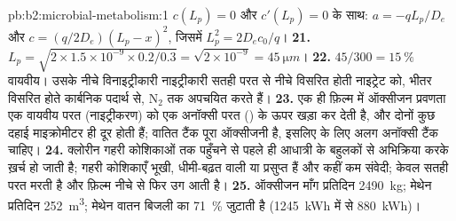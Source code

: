 \begin{solution}{pb:b2:microbial-metabolism:1}
$c(L_p) = 0$ और $c'(L_p) = 0$ के साथ: $a = -qL_p/D_e$ और $c =
(q/2D_e)(L_p - x)^2$, जिसमें $L_p^2 = 2D_ec_0/q$।
\textbf{21.} $L_p = \sqrt{2\times 1.5\times 10^{-9}\times 0.2/0.3} =
\sqrt{2\times 10^{-9}} = \qty{45}{\micro m}$।
\textbf{22.} $45/300 = \qty{15}{\%}$ वायवीय। उसके नीचे विनाइट्रीकारी
नाइट्रीकारी सतही परत से नीचे विसरित होती नाइट्रेट को, भीतर विसरित होते
कार्बनिक पदार्थ से, $\mathrm{N_2}$ तक अपचयित करते हैं।
\textbf{23.} एक ही फ़िल्म में ऑक्सीजन प्रवणता एक वायवीय परत
(नाइट्रीकरण) को एक अनॉक्सी परत () के ऊपर खड़ा कर
देती है, और दोनों कुछ दहाई माइक्रोमीटर ही दूर होती हैं; वातित टैंक पूरा
ऑक्सीजनी है, इसलिए  के लिए अलग अनॉक्सी टैंक चाहिए।
\textbf{24.} क्लोरीन गहरी कोशिकाओं तक पहुँचने से पहले ही आधात्री के
बहुलकों से अभिक्रिया करके ख़र्च हो जाती है; गहरी कोशिकाएँ भूखी,
धीमी-बढ़त वाली या प्रसुप्त हैं और कहीं कम संवेदी; केवल सतही परत मरती है
और फ़िल्म नीचे से फिर उग आती है।
\textbf{25.} ऑक्सीजन माँग प्रतिदिन \qty{2490}{kg}; मेथेन प्रतिदिन
\qty{252}{m^3}; मेथेन वातन बिजली का \qty{71}{\%} जुटाती है
(\qty{1245}{kWh} में से \qty{880}{kWh})।
\end{solution}
